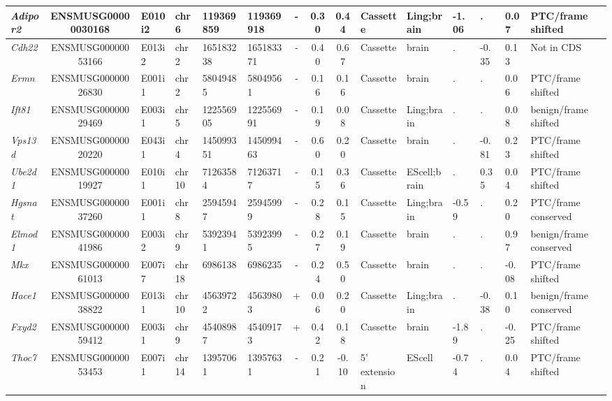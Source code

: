 \begin{appendices}
\begin{landscape}
\begin{table}[htbp]
{\begin{tabular}{|l|c|l|l|l|l|c|c|c|l|l|l|l|l|l|}
		\textit{Adipor2} & ENSMUSG00000030168 & E010i2 & chr6  & 119369859 & 119369918 & -     & 0.30  & 0.44  & Cassette & Ling;brain & -1.06 & .     & 0.07  & PTC/frame shifted \\ \hline
		\textit{Cdh22} & ENSMUSG00000053166 & E013i2 & chr2  & 165183238 & 165183371 & -     & 0.40  & 0.67  & Cassette & brain & .     & -0.35 & 0.13  & Not in CDS \\ \hline
		\textit{Ermn} & ENSMUSG00000026830 & E001i1 & chr2  & 58049485 & 58049561 & -     & 0.16  & 0.16  & Cassette & brain & .     & .     & 0.06  & PTC/frame shifted \\ \hline
		\textit{Ift81} & ENSMUSG00000029469 & E003i1 & chr5  & 122556905 & 122556991 & -     & 0.19  & 0.08  & Cassette & Ling;brain & .     & .     & 0.08  & benign/frame shifted \\ \hline
		\textit{Vps13d} & ENSMUSG00000020220 & E043i1 & chr4  & 145099351 & 145099463 & -     & 0.60  & 0.20  & Cassette & brain & .     & -0.81 & 0.23  & PTC/frame shifted \\ \hline
		\textit{Ube2d1} & ENSMUSG00000019927 & E010i1 & chr10 & 71263584 & 71263717 & -     & 0.15  & 0.36  & Cassette & EScell;brain & .     & 0.35  & 0.04  & PTC/frame shifted \\ \hline
		\textit{Hgsnat} & ENSMUSG00000037260 & E001i1 & chr8  & 25945947 & 25945999 & -     & 0.28  & 0.15  & Cassette & Ling;brain & -0.59 & .     & 0.20  & PTC/frame conserved \\ \hline
		\textit{Elmod1} & ENSMUSG00000041986 & E003i2 & chr9  & 53923941 & 53923995 & -     & 0.27  & 0.19  & Cassette & brain & .     & .     & 0.97  & benign/frame conserved \\ \hline
		\textit{Mkx} & ENSMUSG00000061013 & E007i7 & chr18 & 6986138 & 6986235 & -     & 0.24  & 0.50  & Cassette & brain & .     & .     & -0.08 & PTC/frame shifted \\ \hline
		\textit{Hace1} & ENSMUSG00000038822 & E013i1 & chr10 & 45639722 & 45639803 & +     & 0.06  & 0.20  & Cassette & Ling;brain & .     & -0.38 & 0.10  & benign/frame conserved \\ \hline
		\textit{Fxyd2} & ENSMUSG00000059412 & E003i1 & chr9  & 45408987 & 45409173 & +     & 0.42  & 0.18  & Cassette & brain & -1.89 & .     & -0.25 & PTC/frame shifted \\ \hline
		\textit{Thoc7} & ENSMUSG00000053453 & E007i1 & chr14 & 13957061 & 13957631 & -     & 0.21  & -0.10 & 5' extension & EScell & -0.74 & .     & 0.04  & PTC/frame shifted \\ \hline

\end{tabular}}
\end{table}
\end{landscape}
\end{appendices}
